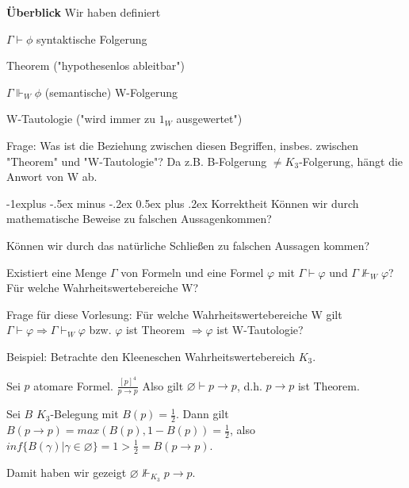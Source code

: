 \documentclass[a4paper]{article}
\makeatletter
\renewcommand{\note}[2]{\begin{noteBox} \textbf{#1} #2 \end{noteBox}}
\renewcommand{\subsection}{\@startsection{subsection}{2}{0mm}%
                {-1explus -.5ex minus -.2ex}%
                {0.5ex plus .2ex}%
                {\normalfont\normalsize\bfseries}}
\makeatother
\begin{document}
\begin{multicols}{3}
  \note{Überblick}{Wir haben definiert
    \begin{itemize*}
      \item $\Gamma\vdash\phi$ syntaktische Folgerung
      \begin{itemize*}
        \item Theorem ("hypothesenlos ableitbar")
      \end{itemize*}
      \item $\Gamma\Vdash_W \phi$ (semantische) W-Folgerung
      \begin{itemize*}
        \item W-Tautologie ("wird immer zu $1_W$ ausgewertet")
      \end{itemize*}
    \end{itemize*}
  }
  Frage: Was ist die Beziehung zwischen diesen Begriffen, insbes. zwischen "Theorem" und "W-Tautologie"? Da z.B. B-Folgerung $\not =K_3$-Folgerung, hängt die Anwort von W ab.

  \subsection{Korrektheit}
  Können wir durch mathematische Beweise zu falschen Aussagenkommen?

  Können wir durch das natürliche Schließen zu falschen Aussagen kommen?

  Existiert eine Menge $\Gamma$ von Formeln und eine Formel $\varphi$ mit $\Gamma\vdash\varphi$ und $\Gamma\not\Vdash_W \varphi$? Für welche Wahrheitswertebereiche W?

  Frage für diese Vorlesung: Für welche Wahrheitswertebereiche W gilt
  $\Gamma\vdash\varphi\Rightarrow\Gamma\vdash_W \varphi$
  bzw.
  $\varphi$ ist Theorem $\Rightarrow\varphi$ ist W-Tautologie?

  Beispiel: Betrachte den Kleeneschen Wahrheitswertebereich $K_3$.
  \begin{itemize*}
    \item Sei $p$ atomare Formel.
    $\frac{[p]^4}{p\rightarrow p}$
    Also gilt $\varnothing\vdash p\rightarrow p$, d.h. $p\rightarrow p$ ist Theorem.
    \item Sei $B$ $K_3$-Belegung mit $B(p)=\frac{1}{2}$. Dann gilt $B(p\rightarrow p) = max(B(p), 1-B(p)) =\frac{1}{2}$, also $inf\{B(\gamma)|\gamma\in\varnothing\}= 1 >\frac{1}{2} = B(p\rightarrow p)$.
  \end{itemize*}
  Damit haben wir gezeigt $\varnothing\not\Vdash_{K_3} p\rightarrow p$.


\end{multicols}
\end{document}
